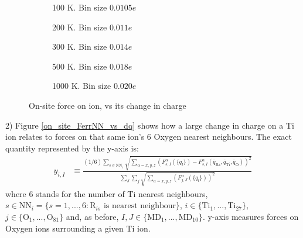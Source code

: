 \documentclass[11pt, a4paper]{report}
\begin{document}
\begin{figure}[h!]
\centering
	\begin{subfigure}[b]{0.45\textwidth}
	\hspace*{-0.4cm}
	
	\vspace*{-0.4cm}
	\caption{100 K. Bin size $0.0105e$}
	\end{subfigure}
	\hspace{0.6cm}
	\begin{subfigure}[b]{0.45\textwidth}
	\hspace*{-0.4cm}
	
	\vspace*{-0.4cm}
	\caption{200 K. Bin size $0.011e$}
	\end{subfigure}
	\quad
	\begin{subfigure}[b]{0.45\textwidth}
	\hspace*{-0.4cm}
	
    \vspace*{-0.4cm}
	\caption{300 K. Bin size $0.014e$}
	\end{subfigure}
	\hspace{0.6cm}
	\begin{subfigure}[b]{0.45\textwidth}
	\hspace*{-0.4cm}
	
    \vspace*{-0.4cm}
	\caption{500 K. Bin size $0.018e$}
	\end{subfigure}
	\quad
	\begin{subfigure}[b]{0.45\textwidth}
	\hspace*{-0.4cm}
	
    \vspace*{-0.4cm}
	\caption{1000 K. Bin size $0.020e$}
	\end{subfigure}
\caption{On-site force on ion, vs its change in charge}
\label{on_site_Ferr_vs_dq}
\end{figure}

2) Figure \ref{on_site_FerrNN_vs_dq} shows how a large change in charge on a Ti ion relates to forces on that same ion's $6$ Oxygen nearest neighbours. The exact quantity represented by the y-axis is:
\begin{align*}
y_{i,I} &\equiv  \frac{(1/6)\sum_{s\in \text{NN}_i}\sqrt{\sum_{\alpha = x,y,z}\left(F_{s,I}^{\alpha}(\{q_l\})-F_{s,I}^{\alpha}(\bar{q}_{\text{Ba}},\bar{q}_{\text{Ti}},\bar{q}_{\text{O}})\right)^2}}{\sum_{J}\sum_{j}\sqrt{\sum_{\alpha = x,y,z}\left(F_{j,J}^{\alpha}(\{q_l\})\right)^2}}
\end{align*}
where $6$ stands for the number of Ti nearest neighbours, $s\in\text{NN}_i=\{s=1,...,6 : \text{R}_{is} \text{ is nearest neighbour}\}$, $i\in \{\text{Ti}_1,...,\text{Ti}_{27}\}$, $j\in \{\text{O}_1,...,\text{O}_{81}\}$ and, as before, $I,J\in\{\text{MD}_1,...,\text{MD}_{10}\}$. y-axis measures forces on Oxygen ions surrounding a given Ti ion. 
\end{document}
